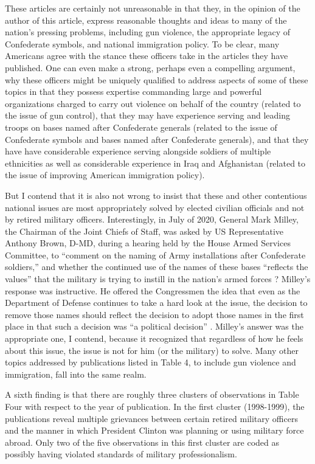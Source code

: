 \documentclass[12pt,]{article}
\begin{document}
These articles are certainly not unreasonable in that they, in the opinion of the author of this article, express reasonable thoughts and ideas to many of the nation's pressing problems, including gun violence, the appropriate legacy of Confederate symbols, and national immigration policy. To be clear, many Americans agree with the stance these officers take in the articles they have published. One can even make a strong, perhaps even a compelling argument, why these officers might be uniquely qualified to address aspects of some of these topics in that they possess expertise commanding large and powerful organizations charged to carry out violence on behalf of the country (related to the issue of gun control), that they may have experience serving and leading troops on bases named after Confederate generals (related to the issue of Confederate symbols and bases named after Confederate generals), and that they have have considerable experience serving alongside soldiers of multiple ethnicities as well as considerable experience in Iraq and Afghanistan (related to the issue of improving American immigration policy).

But I contend that it is also not wrong to insist that these and other contentious national issues are most appropriately solved by elected civilian officials and not by retired military officers. Interestingly, in July of 2020, General Mark Milley, the Chairman of the Joint Chiefs of Staff, was asked by US Representative Anthony Brown, D-MD, during a hearing held by the House Armed Services Committee, to ``comment on the naming of Army installations after Confederate soldiers,'' and whether the continued use of the names of these bases ``reflects the values'' that the military is trying to instill in the nation's armed forces \autocite{milley_mark_general_2020}? Milley's response was instructive. He offered the Congressmen the idea that even as the Department of Defense continues to take a hard look at the issue, the decision to remove those names should reflect the decision to adopt those names in the first place in that such a decision was ``a political decision'' \autocite{milley_mark_general_2020}. Milley's answer was the appropriate one, I contend, because it recognized that regardless of how he feels about this issue, the issue is not for him (or the military) to solve. Many other topics addressed by publications listed in Table 4, to include gun violence and immigration, fall into the same realm.

A sixth finding is that there are roughly three clusters of observations in Table Four with respect to the year of publication. In the first cluster (1998-1999), the publications reveal multiple grievances between certain retired military officers and the manner in which President Clinton was planning or using military force abroad. Only two of the five observations in this first cluster are coded as possibly having violated standards of military professionalism.
\end{document}
